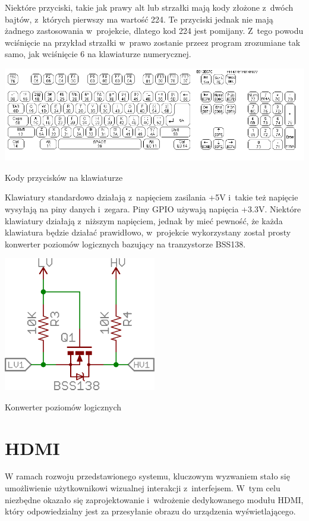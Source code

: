 \documentclass[shortabstract]{iithesis}
\begin{document}
Niektóre przyciski, takie jak prawy alt lub strzałki mają kody złożone z~dwóch bajtów, z~których pierwszy ma wartość 224. Te przyciski jednak nie mają żadnego zastosowania w~projekcie, dlatego kod 224 jest pomijany. Z~tego powodu wciśnięcie na przykład strzałki w~prawo zostanie przeez program zrozumiane tak samo, jak wciśnięcie 6 na klawiaturze numerycznej.

\begingroup
\centering
\includegraphics[width=\textwidth]{scancode.png}
\captionsetup{type=figure}
\caption{Kody przycisków na klawiaturze}
\endgroup

Klawiatury standardowo działają z~napięciem zasilania +5V i~takie też napięcie wysyłają na piny danych i~zegara. Piny GPIO używają napięcia +3.3V. Niektóre klawiatury działają z~niższym napięciem, jednak by mieć pewność, że każda klawiatura będzie działać prawidłowo, w~projekcie wykorzystany został prosty konwerter poziomów logicznych bazujący na tranzystorze BSS138.

\begingroup
\centering
\includegraphics[width=0.5\textwidth]{bss.png}
\captionsetup{type=figure}
\caption{Konwerter poziomów logicznych}
\endgroup

\section{HDMI}
W ramach rozwoju przedstawionego systemu, kluczowym wyzwaniem stało się umożliwienie użytkownikowi wizualnej interakcji z~interfejsem. W~tym celu niezbędne okazało się zaprojektowanie i~wdrożenie dedykowanego modułu HDMI, który odpowiedzialny jest za przesyłanie obrazu do urządzenia wyświetlającego.
\end{document}
